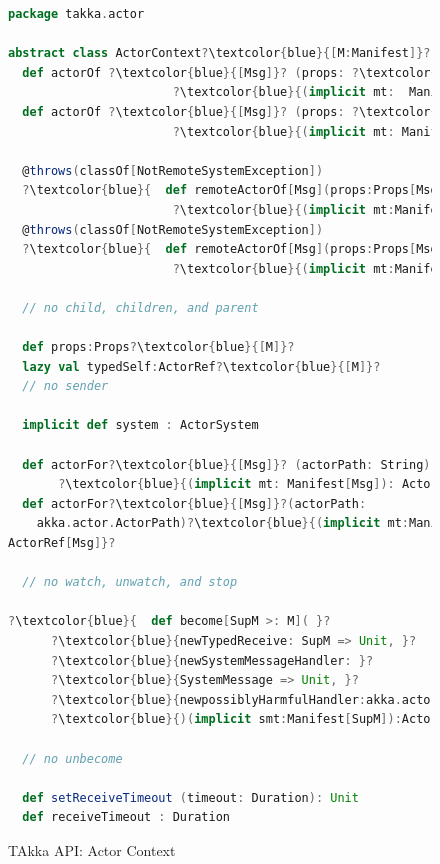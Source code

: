 \begin{figure}[p]
      \begin{lstlisting}[language=scala, escapechar=?]
package takka.actor

abstract class ActorContext?\textcolor{blue}{[M:Manifest]}?
  def actorOf ?\textcolor{blue}{[Msg]}? (props: ?\textcolor{blue}{Props[Msg]}?)
                       ?\textcolor{blue}{(implicit mt:  Manifest[Msg])}?: ActorRef[Msg]
  def actorOf ?\textcolor{blue}{[Msg]}? (props: ?\textcolor{blue}{Props[Msg]}?, name: String)
                       ?\textcolor{blue}{(implicit mt: Manifest[Msg])}?: ActorRef[Msg]

  @throws(classOf[NotRemoteSystemException])
  ?\textcolor{blue}{  def remoteActorOf[Msg](props:Props[Msg])}?
                       ?\textcolor{blue}{(implicit mt:Manifest[Msg]):ActorRef[Msg]}?
  @throws(classOf[NotRemoteSystemException])
  ?\textcolor{blue}{  def remoteActorOf[Msg](props:Props[Msg], name:String)}?
                       ?\textcolor{blue}{(implicit mt:Manifest[Msg]) :ActorRef[Msg]}?

  // no child, children, and parent
  
  def props:Props?\textcolor{blue}{[M]}?
  lazy val typedSelf:ActorRef?\textcolor{blue}{[M]}?
  // no sender

  implicit def system : ActorSystem 
  
  def actorFor?\textcolor{blue}{[Msg]}? (actorPath: String)
       ?\textcolor{blue}{(implicit mt: Manifest[Msg]): ActorRef[Msg]}?
  def actorFor?\textcolor{blue}{[Msg]}?(actorPath: 
    akka.actor.ActorPath)?\textcolor{blue}{(implicit mt:Manifest[Msg]): 
ActorRef[Msg]}?

  // no watch, unwatch, and stop    

?\textcolor{blue}{  def become[SupM >: M]( }?
      ?\textcolor{blue}{newTypedReceive: SupM => Unit, }?
      ?\textcolor{blue}{newSystemMessageHandler: }?
      ?\textcolor{blue}{SystemMessage => Unit, }?
      ?\textcolor{blue}{newpossiblyHarmfulHandler:akka.actor.PossiblyHarmful => Unit }?
      ?\textcolor{blue}{)(implicit smt:Manifest[SupM]):ActorRef[SupM]  }?
  
  // no unbecome

  def setReceiveTimeout (timeout: Duration): Unit  
  def receiveTimeout : Duration

    \end{lstlisting}
    \caption{TAkka API: Actor Context}
    \label{takka_api_actor_context}
\end{figure}

